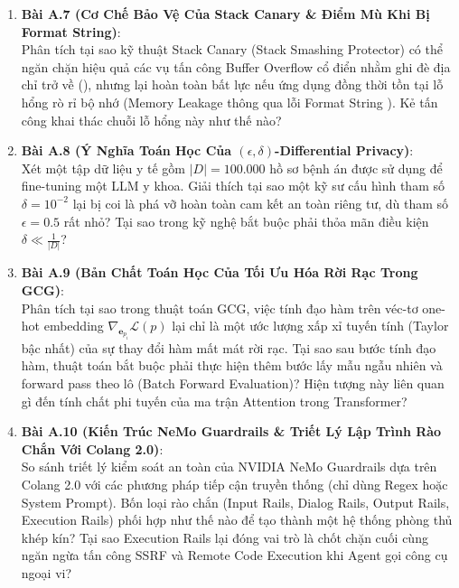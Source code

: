 \begin{enumerate}
  \item \textbf{Bài A.7 (Cơ Chế Bảo Vệ Của Stack Canary \& Điểm Mù Khi Bị Format String)}: \\
  Phân tích tại sao kỹ thuật Stack Canary (Stack Smashing Protector) có thể ngăn chặn hiệu quả các vụ tấn công Buffer Overflow cổ điển nhằm ghi đè địa chỉ trở về (), nhưng lại hoàn toàn bất lực nếu ứng dụng đồng thời tồn tại lỗ hổng rò rỉ bộ nhớ (Memory Leakage thông qua lỗi Format String ). Kẻ tấn công khai thác chuỗi lỗ hổng này như thế nào?

  \item \textbf{Bài A.8 (Ý Nghĩa Toán Học Của $(\epsilon, \delta)$-Differential Privacy)}: \\
  Xét một tập dữ liệu y tế gồm $|D| = 100.000$ hồ sơ bệnh án được sử dụng để fine-tuning một LLM y khoa.
  Giải thích tại sao một kỹ sư cấu hình tham số $\delta = 10^{-2}$ lại bị coi là phá vỡ hoàn toàn cam kết an toàn riêng tư, dù tham số $\epsilon = 0.5$ rất nhỏ? Tại sao trong kỹ nghệ bắt buộc phải thỏa mãn điều kiện $\delta \ll \frac{1}{|D|}$?

  \item \textbf{Bài A.9 (Bản Chất Toán Học Của Tối Ưu Hóa Rời Rạc Trong GCG)}: \\
  Phân tích tại sao trong thuật toán GCG, việc tính đạo hàm trên véc-tơ one-hot embedding $\nabla_{\mathbf{e}_{p_i}} \mathcal{L}(p)$ lại chỉ là một ước lượng xấp xỉ tuyến tính (Taylor bậc nhất) của sự thay đổi hàm mất mát rời rạc. Tại sao sau bước tính đạo hàm, thuật toán bắt buộc phải thực hiện thêm bước lấy mẫu ngẫu nhiên và forward pass theo lô (Batch Forward Evaluation)? Hiện tượng này liên quan gì đến tính chất phi tuyến của ma trận Attention trong Transformer?

  \item \textbf{Bài A.10 (Kiến Trúc NeMo Guardrails \& Triết Lý Lập Trình Rào Chắn Với Colang 2.0)}: \\
  So sánh triết lý kiểm soát an toàn của NVIDIA NeMo Guardrails dựa trên Colang 2.0 với các phương pháp tiếp cận truyền thống (chỉ dùng Regex hoặc System Prompt). Bốn loại rào chắn (Input Rails, Dialog Rails, Output Rails, Execution Rails) phối hợp như thế nào để tạo thành một hệ thống phòng thủ khép kín? Tại sao Execution Rails lại đóng vai trò là chốt chặn cuối cùng ngăn ngừa tấn công SSRF và Remote Code Execution khi Agent gọi công cụ ngoại vi?
\end{enumerate}

